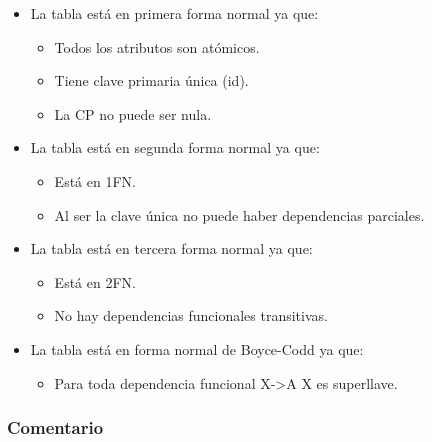 \documentclass[12pt,a4paperpaper,]{report}
\providecommand{\tightlist}{%
  \setlength{\itemsep}{0pt}\setlength{\parskip}{0pt}}
\begin{document}
\begin{itemize}
\tightlist
\item
  La tabla está en primera forma normal ya que:

  \begin{itemize}
  \tightlist
  \item
    Todos los atributos son atómicos.
  \item
    Tiene clave primaria única (id).
  \item
    La CP no puede ser nula.
  \end{itemize}
\item
  La tabla está en segunda forma normal ya que:

  \begin{itemize}
  \tightlist
  \item
    Está en 1FN.
  \item
    Al ser la clave única no puede haber dependencias parciales.
  \end{itemize}
\item
  La tabla está en tercera forma normal ya que:

  \begin{itemize}
  \tightlist
  \item
    Está en 2FN.
  \item
    No hay dependencias funcionales transitivas.
  \end{itemize}
\item
  La tabla está en forma normal de Boyce-Codd ya que:

  \begin{itemize}
  \tightlist
  \item
    Para toda dependencia funcional X-\textgreater{}A X es superllave.
  \end{itemize}
\end{itemize}

\subsubsection{Comentario}\label{comentario}
\end{document}
